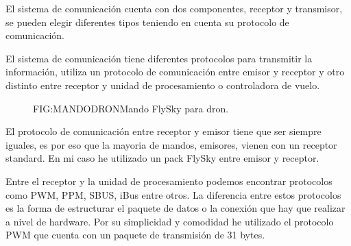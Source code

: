 
	El sistema de comunicación cuenta con dos componentes, receptor y transmisor, se pueden elegir diferentes tipos teniendo en cuenta su protocolo de comunicación. 
	
	El sistema de comunicación tiene diferentes protocolos para transmitir la información, utiliza un protocolo de comunicación entre emisor y receptor y otro distinto entre receptor y unidad de procesamiento o controladora de vuelo.\cite{Eric2017}
	
	\begin{figure}{FIG:MANDODRON}{Mando FlySky para dron.}
\end{figure}	
	
	El protocolo de comunicación entre receptor y emisor tiene que ser siempre iguales, es por eso que la mayoria de mandos, emisores, vienen con un receptor standard. En mi caso he utilizado un pack FlySky entre emisor y receptor.
	
	Entre el receptor y la unidad de procesamiento podemos encontrar protocolos como PWM, PPM, SBUS, iBus entre otros. La diferencia entre estos protocolos es la forma de estructurar el paquete de datos o la conexión que hay que realizar a nivel de hardware. Por su simplicidad y comodidad he utilizado el protocolo PWM que cuenta con un paquete de transmisión de 31 bytes.
	
